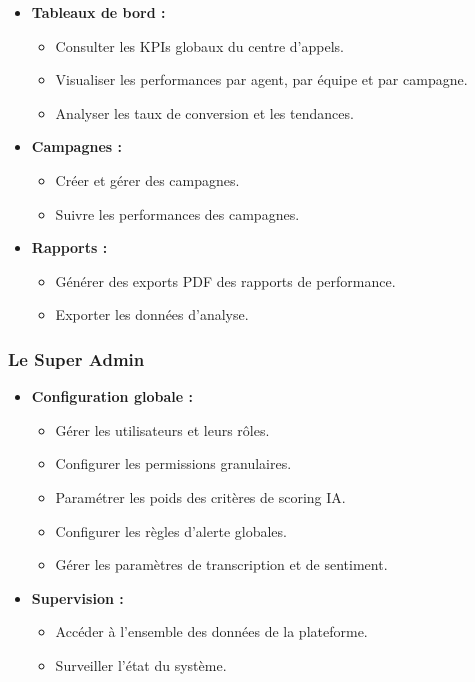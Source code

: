 \begin{itemize}[label=--, itemsep=3pt]
    \item \textbf{Tableaux de bord :}
    \begin{itemize}[label=--, itemsep=2pt]
        \item Consulter les KPIs globaux du centre d'appels.
        \item Visualiser les performances par agent, par équipe et par campagne.
        \item Analyser les taux de conversion et les tendances.
    \end{itemize}

    \item \textbf{Campagnes :}
    \begin{itemize}[label=--, itemsep=2pt]
        \item Créer et gérer des campagnes.
        \item Suivre les performances des campagnes.
    \end{itemize}

    \item \textbf{Rapports :}
    \begin{itemize}[label=--, itemsep=2pt]
        \item Générer des exports PDF des rapports de performance.
        \item Exporter les données d'analyse.
    \end{itemize}
\end{itemize}

\subsubsection{Le Super Admin}

\begin{itemize}[label=--, itemsep=3pt]
    \item \textbf{Configuration globale :}
    \begin{itemize}[label=--, itemsep=2pt]
        \item Gérer les utilisateurs et leurs rôles.
        \item Configurer les permissions granulaires.
        \item Paramétrer les poids des critères de scoring IA.
        \item Configurer les règles d'alerte globales.
        \item Gérer les paramètres de transcription et de sentiment.
    \end{itemize}

    \item \textbf{Supervision :}
    \begin{itemize}[label=--, itemsep=2pt]
        \item Accéder à l'ensemble des données de la plateforme.
        \item Surveiller l'état du système.
    \end{itemize}
\end{itemize}

